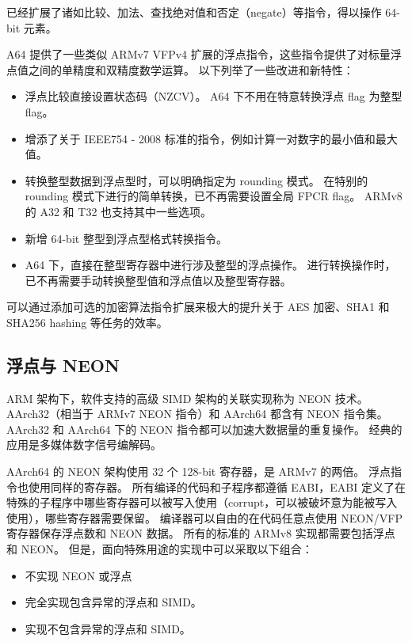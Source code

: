 已经扩展了诸如比较、加法、查找绝对值和否定（negate）等指令，得以操作 64-bit 元素。


A64 提供了一些类似 ARMv7 VFPv4 扩展的浮点指令，这些指令提供了对标量浮点值之间的单精度和双精度数学运算。
以下列举了一些改进和新特性：

\begin{itemize}
  \item 浮点比较直接设置状态码（NZCV）。
    A64 下不用在特意转换浮点 flag 为整型 flag。
  \item 增添了关于 IEEE754 - 2008 标准的指令，例如计算一对数字的最小值和最大值。
  \item 转换整型数据到浮点型时，可以明确指定为 rounding 模式。
    在特别的 rounding 模式下进行的简单转换，已不再需要设置全局 FPCR flag。
    ARMv8 的 A32 和 T32 也支持其中一些选项。
  \item 新增 64-bit 整型到浮点型格式转换指令。
  \item A64 下，直接在整型寄存器中进行涉及整型的浮点操作。
    进行转换操作时，已不再需要手动转换整型值和浮点值以及整型寄存器。
\end{itemize}


可以通过添加可选的加密算法指令扩展来极大的提升关于 AES 加密、SHA1 和 SHA256 hashing 等任务的效率。

\subsection{浮点与 NEON} \label{sec:floating-neon}

ARM 架构下，软件支持的高级 SIMD 架构的关联实现称为 NEON 技术。
AArch32（相当于 ARMv7 NEON 指令）和 AArch64 都含有 NEON 指令集。
AArch32 和 AArch64 下的 NEON 指令都可以加速大数据量的重复操作。
经典的应用是多媒体数字信号编解码。

AArch64 的 NEON 架构使用 32 个 128-bit 寄存器，是 ARMv7 的两倍。
浮点指令也使用同样的寄存器。
所有编译的代码和子程序都遵循 EABI，EABI 定义了在特殊的子程序中哪些寄存器可以被写入使用（corrupt，可以被破坏意为能被写入使用），哪些寄存器需要保留。
编译器可以自由的在代码任意点使用 NEON/VFP 寄存器保存浮点数和 NEON 数据。
所有的标准的 ARMv8 实现都需要包括浮点和 NEON。
但是，面向特殊用途的实现中可以采取以下组合：
\begin{itemize}
  \item 不实现 NEON 或浮点
  \item 完全实现包含异常的浮点和 SIMD。
  \item 实现不包含异常的浮点和 SIMD。
\end{itemize}

